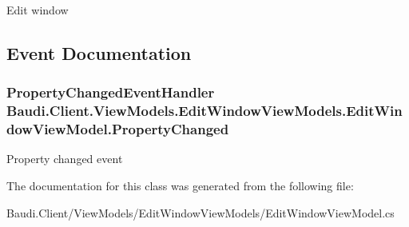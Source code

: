 Edit window 



\subsection{Event Documentation}
\hypertarget{class_baudi_1_1_client_1_1_view_models_1_1_edit_window_view_models_1_1_edit_window_view_model_a26434662118b5a93812ee8ecfebd7d13}{}
\subsubsection[{Property\+Changed}]{\setlength{\rightskip}{0pt plus 5cm}Property\+Changed\+Event\+Handler Baudi.\+Client.\+View\+Models.\+Edit\+Window\+View\+Models.\+Edit\+Window\+View\+Model.\+Property\+Changed}\label{class_baudi_1_1_client_1_1_view_models_1_1_edit_window_view_models_1_1_edit_window_view_model_a26434662118b5a93812ee8ecfebd7d13}


Property changed event 



The documentation for this class was generated from the following file\+:\begin{DoxyCompactItemize}
\item 
Baudi.\+Client/\+View\+Models/\+Edit\+Window\+View\+Models/Edit\+Window\+View\+Model.\+cs\end{DoxyCompactItemize}
